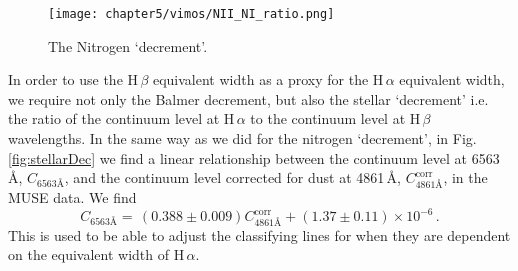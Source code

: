 
		\begin{figure}
			\centering
			\texttt{[image: chapter5/vimos/NII\_NI\_ratio.png]}
			\caption[The nitrogen `decrement']{The Nitrogen `decrement'.} 
			\label{fig:NII_NI}
		\end{figure}




		In order to use the H\,$\beta$ equivalent width as a proxy for the H\,$\alpha$ equivalent width, we require not only the Balmer decrement, but also the stellar `decrement' i.e. the ratio of the continuum level at H\,$\alpha$ to the continuum level at H\,$\beta$ wavelengths. In the same way as we did for the nitrogen `decrement', in Fig.\,\ref{fig:stellarDec} we find a linear relationship between the continuum level at 6563\,\AA, $C_\text{6563\AA}$, and the continuum level corrected for dust at 4861\,\AA, $C^\text{corr}_\text{4861\AA}$, in the MUSE data. We find
		\begin{equation}
			C_\text{6563\AA} = \, (0.388 \pm 0.009) C^\text{corr}_\text{4861\AA} + (1.37 \pm 0.11) \times 10^{-6} \, .
		\end{equation}
		This is used to be able to adjust the classifying lines for when they are dependent on the equivalent width of H\,$\alpha$. 

